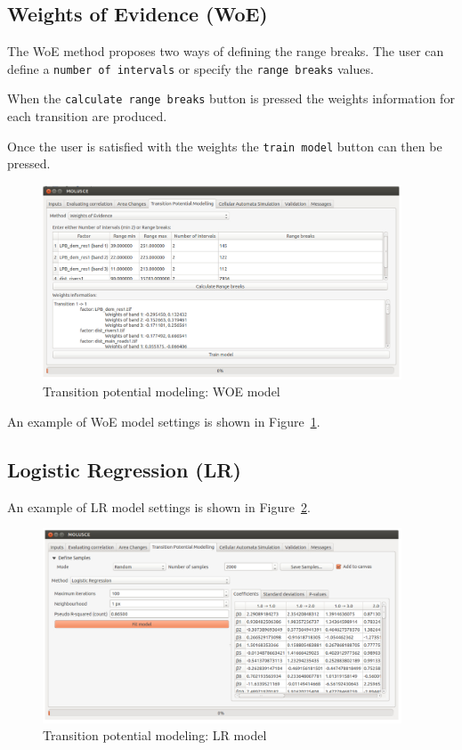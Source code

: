 \documentclass{report}
\begin{document}
\subsection{Weights of Evidence (WoE)}
The WoE \cite{bonham1989weights} method proposes two ways of defining the range breaks. 
The user can define a \verb+number of intervals+ or specify the 
\verb+range breaks+ values.

When the \verb+calculate range breaks+ button is pressed the weights information for each transition are
produced.

Once the user is satisfied with the weights the \verb+train model+ button can then be pressed.

\begin{figure}[h!]
\centering
\includegraphics[width=0.95\textwidth]{img/woe_model.png}
\caption{Transition potential modeling: WOE model}
\label{fig:woe_model}
\end{figure}

An example of WoE model settings is shown in Figure~\ref{fig:woe_model}.

\subsection{Logistic Regression (LR)}

An example of LR model settings is shown in Figure~\ref{fig:lr_model}.

\begin{figure}[h!]
\centering
\includegraphics[width=0.95\textwidth]{img/lr_model.png}
\caption{Transition potential modeling: LR model}
\label{fig:lr_model}
\end{figure}
\end{document}
